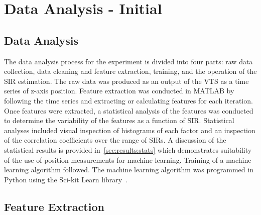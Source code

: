 \section{Data Analysis - Initial}\label{ftml-conf:sec:dataanalysis}

\subsection{Data Analysis}\label{ftml-conf:sec:dataanalysis}


The data analysis process for the experiment
is divided into four parts: raw data collection, data cleaning and feature extraction, training, and the operation of the SIR estimation.  The raw data was produced as an output of the VTS as a time series of z-axis position.  Feature extraction was conducted in MATLAB by following the time series and extracting or calculating features for each iteration.  Once features were extracted, a statistical analysis of the features was conducted to determine the variability of the features as a function of SIR.  Statistical analyses included visual inspection of histograms of each factor and an inspection of the correlation coefficients over the range  of SIRs.  A discussion of the statistical results is provided in~\ref{sec:results:stats} which demonstrates suitability of the use of position measurements for machine learning. Training of a machine learning algorithm followed. The machine learning algorithm was programmed in Python using the Sci-kit Learn library~\cite{SCIKITLEARN}.

\subsection{Feature Extraction}\label{ftml-conf:sec:data:feats}


